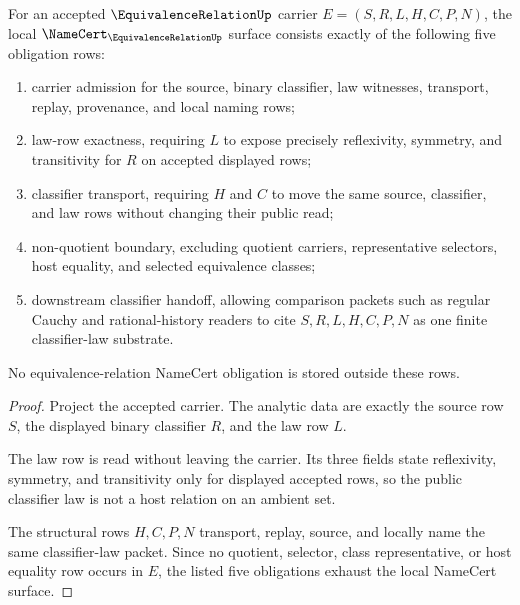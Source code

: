 \begin{theorem}
\label{thm:equivalence-relation-namecert-obligations}
For an accepted $\EquivalenceRelationUp$ carrier $E=(S,R,L,H,C,P,N)$, the local $\NameCert_{\EquivalenceRelationUp}$ surface consists exactly of the following five obligation rows:
\begin{enumerate}
\item carrier admission for the source, binary classifier, law witnesses, transport, replay, provenance, and local naming rows;
\item law-row exactness, requiring $L$ to expose precisely reflexivity, symmetry, and transitivity for $R$ on accepted displayed rows;
\item classifier transport, requiring $H$ and $C$ to move the same source, classifier, and law rows without changing their public read;
\item non-quotient boundary, excluding quotient carriers, representative selectors, host equality, and selected equivalence classes;
\item downstream classifier handoff, allowing comparison packets such as regular Cauchy and rational-history readers to cite $S,R,L,H,C,P,N$ as one finite classifier-law substrate.
\end{enumerate}
No equivalence-relation NameCert obligation is stored outside these rows.
\end{theorem}
\begin{proof}
Project the accepted carrier. The analytic data are exactly the source row $S$, the displayed binary classifier $R$, and the law row $L$.

The law row is read without leaving the carrier. Its three fields state reflexivity, symmetry, and transitivity only for displayed accepted rows, so the public classifier law is not a host relation on an ambient set.

The structural rows $H,C,P,N$ transport, replay, source, and locally name the same classifier-law packet. Since no quotient, selector, class representative, or host equality row occurs in $E$, the listed five obligations exhaust the local NameCert surface.
\end{proof}


